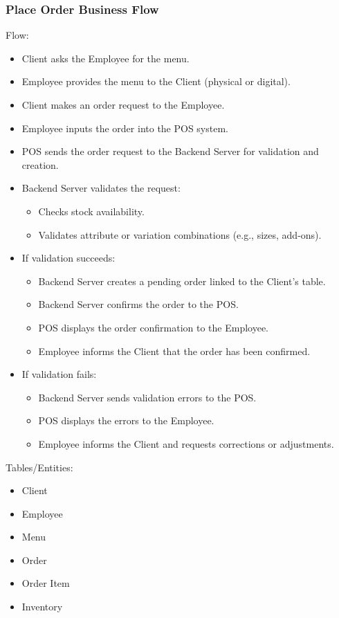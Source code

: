 \documentclass[]{VUMIFTemplateClass}
\begin{document}
\subsubsection{Place Order Business Flow}

Flow:
\begin{itemize}
\setlength{\itemsep}{2pt}
\setlength{\parskip}{0pt}
\setlength{\parsep}{0pt}
\item Client asks the Employee for the menu.
\item Employee provides the menu to the Client (physical or digital).
\item Client makes an order request to the Employee.
\item Employee inputs the order into the POS system.
\item POS sends the order request to the Backend Server for validation and creation.
\item Backend Server validates the request:
\begin{itemize}
\item Checks stock availability.
\item Validates attribute or variation combinations (e.g., sizes, add-ons).
\end{itemize}
\item If validation succeeds:
\begin{itemize}
\item Backend Server creates a pending order linked to the Client’s table.
\item Backend Server confirms the order to the POS.
\item POS displays the order confirmation to the Employee.
\item Employee informs the Client that the order has been confirmed.
\end{itemize}
\item If validation fails:
\begin{itemize}
\item Backend Server sends validation errors to the POS.
\item POS displays the errors to the Employee.
\item Employee informs the Client and requests corrections or adjustments.
\end{itemize}
\end{itemize}

Tables/Entities:
\begin{itemize}
\setlength{\itemsep}{2pt}
\setlength{\parskip}{0pt}
\setlength{\parsep}{0pt}
\item Client
\item Employee
\item Menu
\item Order
\item Order Item 
\item Inventory
\end{itemize}
\end{document}
